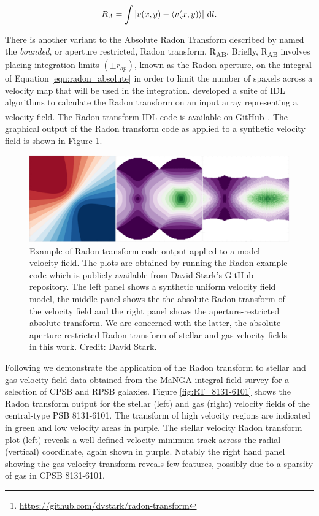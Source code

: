 \begin{equation}
    \label{eqn:radon_absolute}
    R_A=\int{| v(x,y) - \langle v(x,y) \rangle | \, \mathop{}\!\mathrm{d}l}.
\end{equation}

There is another variant to the Absolute Radon Transform described by \citet{2018MNRAS.480.2217S} named the \textit{bounded}, or aperture restricted, Radon transform, R\textsubscript{AB}. Briefly, R\textsubscript{AB} involves placing integration limits $(\pm{r_{ap}})$, known as the Radon aperture, on the integral of Equation \ref{eqn:radon_absolute} in order to limit the number of spaxels across a velocity map that will be used in the integration. \citet{2018MNRAS.480.2217S} developed a suite of IDL algorithms to calculate the Radon transform on an input array representing a velocity field. The Radon transform IDL code is available on GitHub\footnote{\href{https://github.com/dvstark/radon-transform}{https://github.com/dvstark/radon-transform}}. 
The graphical output of the Radon transform code as applied to a synthetic velocity field is shown in Figure \ref{fig:Radon}.

\begin{figure}
    \centering
   	\includegraphics[width=\columnwidth]{images/RadonPlots/example.png}
    \caption[Model velocity field Radon transform plots]{Example of Radon transform code output applied to a model velocity field. The plots are obtained by running the Radon example code which is publicly available from David Stark's GitHub repository. The left panel shows a synthetic uniform velocity field model, the middle panel shows the the absolute Radon transform of the velocity field and the right panel shows the aperture-restricted absolute transform. We are concerned with the latter, the absolute aperture-restricted Radon transform of stellar and gas velocity fields in this work. Credit: David Stark.}
    \label{fig:Radon}
\end{figure}

Following \citet{2018MNRAS.480.2217S} we demonstrate the application of the Radon transform to stellar and gas velocity field data obtained from the MaNGA integral field survey for a selection of CPSB and RPSB galaxies. Figure \ref{fig:RT_8131-6101} shows the Radon transform output for the stellar (left) and gas (right) velocity fields of the central-type PSB 8131-6101. The transform of high velocity regions are indicated in green and low velocity areas in purple. The stellar velocity Radon transform plot (left) reveals a well defined velocity minimum track across the radial (vertical) coordinate, again shown in purple. Notably the right hand panel showing the gas velocity transform reveals few features, possibly due to a sparsity of gas in CPSB 8131-6101.

